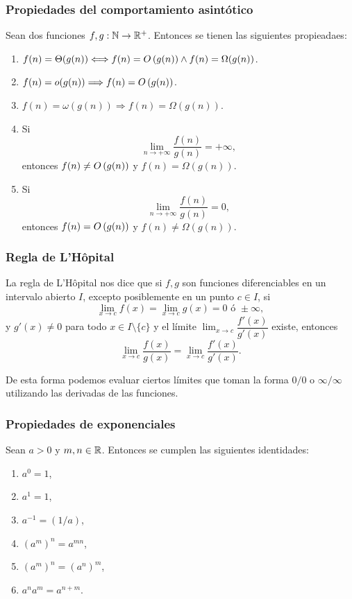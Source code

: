 \subsubsection*{Propiedades del comportamiento asintótico}
Sean dos funciones $f,g:\mathbb{N}\to\mathbb{R}^+$. Entonces se tienen las siguientes propieadaes:
\begin{enumerate}
    \item $f(n)=\Theta(g(n)) \Longleftrightarrow f(n)=O\left(g(n)\right) \wedge f(n)=\Omega(g(n))$.
    \item $f(n)=o(g(n)) \Longrightarrow f(n)=O\left(g(n)\right)$.
    \item $f(n)=\omega(g(n)) \Longrightarrow f(n)=\Omega(g(n))$.
    \item Si
    $$
    \lim_{n\to+\infty}\dfrac{f(n)}{g(n)}=+\infty,
    $$
    entonces $f(n)\not=O\left(g(n)\right)$ y $f(n)=\Omega(g(n))$.
    \item Si
    $$
    \lim_{n\to+\infty}\dfrac{f(n)}{g(n)}=0,
    $$
    entonces $f(n)=O\left(g(n)\right)$ y $f(n)\not=\Omega(g(n))$.
\end{enumerate}

\subsubsection*{Regla de L'Hôpital}

La regla de L'Hôpital nos dice que si $f,g$ son funciones diferenciables en un intervalo abierto $I$, excepto posiblemente en un punto $c\in I$, si 
$$
\lim_{x\to c} f(x) = \lim_{x\to c} g(x) = 0\text{ ó }\pm\infty,
$$
y $g'(x)\not=0$ para todo $x\in I\setminus\{c\}$ y el límite $\lim_{x\to c} \dfrac{f'(x)}{g'(x)}$ existe, entonces
$$
\lim_{x\to c} \dfrac{f(x)}{g(x)} = \lim_{x\to c} \dfrac{f'(x)}{g'(x)}.
$$

De esta forma podemos evaluar ciertos límites que toman la forma $0/0$ o $\infty/\infty$ utilizando las derivadas de las funciones.


\subsubsection*{Propiedades de exponenciales}
Sean $a>0$ y $m,n\in\mathbb{R}$. Entonces se cumplen las siguientes identidades:
\begin{enumerate}
    \item $a^0=1$,
    \item $a^1=1$,
    \item $a^{-1} = (1/a)$,
    \item $(a^m)^n = a^{mn}$,
    \item $(a^m)^n = (a^{n})^m$,
    \item $a^na^m = a^{n+m}$.
\end{enumerate}


